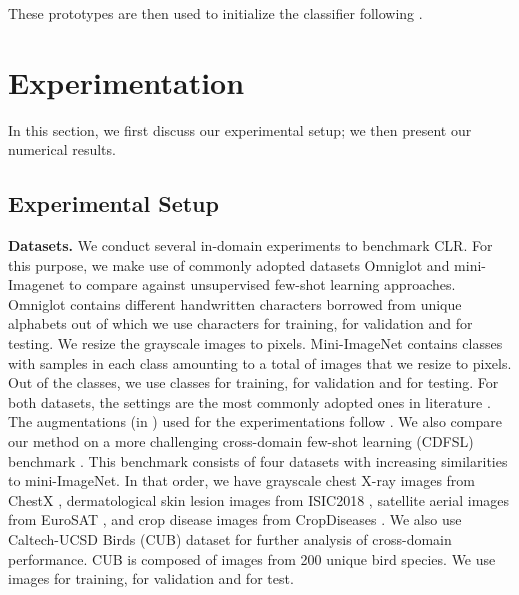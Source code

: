 \documentclass{article}
\begin{document}
These prototypes are then used to initialize the classifier  following \citep{Medina2020Self-SupervisedClassification}. 

\section{Experimentation}\label{sec:experiments}
In this section, we first discuss our experimental setup; we then present our numerical results. 

\subsection{Experimental Setup}\label{ssec:exp-setup}
\textbf{Datasets.} We conduct several in-domain experiments to benchmark CLR. For this purpose, we make use of commonly adopted datasets Omniglot \citep{Lake2015Human-levelInduction} and mini-Imagenet \citep{Vinyals2016MatchingLearning} to compare against unsupervised few-shot learning approaches. 
Omniglot contains  different handwritten characters borrowed from  unique alphabets out of which we use  characters for training,  for validation and  for testing. We  resize the grayscale images to  pixels. Mini-ImageNet contains  classes with  samples in each class amounting to a total of  images that we resize to  pixels. Out of the  classes, we use  classes for training,  for validation and   for testing. For both datasets, the settings are the most commonly adopted ones in literature \citep{Vinyals2016MatchingLearning, Medina2020Self-SupervisedClassification, Ji2019UnsupervisedTraining, Khodadadeh2018UnsupervisedClassification}. The augmentations (in ) used for the experimentations follow \citep{Medina2020Self-SupervisedClassification}.
We also compare our method on a more challenging cross-domain few-shot learning (CDFSL) benchmark \citep{guo2019new}. This benchmark consists of four datasets with increasing similarities to mini-ImageNet. In that order, we have grayscale chest X-ray images from ChestX \citep{wang2017chestx}, dermatological skin lesion images from ISIC2018 \citep{isic2018dataset},  satellite aerial images from EuroSAT \citep{helber2017eurosat}, and crop disease images from CropDiseases \citep{mohanty2016using}. We also use Caltech-UCSD Birds (CUB) dataset \citep{WahCUB_200_2011} for further analysis of cross-domain performance. CUB is composed of  images from 200 unique bird species. We use  images for training,  for validation and  for test. 
\end{document}
